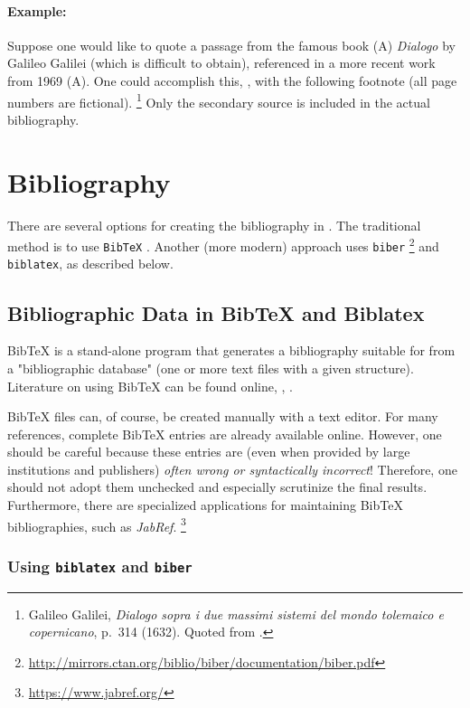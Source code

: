 \paragraph{Example:} Suppose one would like to quote a passage from the famous
book (\textrm{A}) \emph{Dialogo} by Galileo Galilei (which is difficult to obtain),
referenced in a more recent work from 1969 (\textrm{A}). One could accomplish this,
\eg, with the following footnote (all page numbers are fictional).%
\footnote{Galileo Galilei, \emph{Dialogo sopra i due massimi sistemi del
mondo tolemaico e copernicano}, p.~314 (1632). Quoted from 
\cite[p.~59]{Hemleben1969}.}
Only the secondary source \cite{Hemleben1969} is included in the actual bibliography.


\section{Bibliography}

There are several options for creating the bibliography in \latex. The
traditional method is to use \texttt{BibTeX} \cite{Patashnik1988}. Another (more
modern) approach uses \texttt{biber}%
\footnote{\url{http://mirrors.ctan.org/biblio/biber/documentation/biber.pdf}}
and \texttt{biblatex}, as described below.


\subsection{Bibliographic Data in BibTeX and Biblatex}
\label{sec:bibtex}

BibTeX is a stand-alone program that generates a bibliography suitable for
\latex from a "bibliographic database" (one or more text files with a given
structure). Literature on using BibTeX can be found online, \eg,
\cite{Feder2006, Patashnik1988}.

BibTeX files can, of course, be created manually with a text editor. For many
references, complete BibTeX entries are already available online. However, one
should be careful because these entries are (even when provided by large
institutions and publishers) \emph{often wrong or syntactically incorrect}!
Therefore, one should not adopt them unchecked and especially scrutinize the
final results. Furthermore, there are specialized applications for maintaining
BibTeX bibliographies, such as \emph{JabRef}.%
\footnote{\url{https://www.jabref.org/}}

\subsubsection{Using \texttt{biblatex} and \texttt{biber}}

